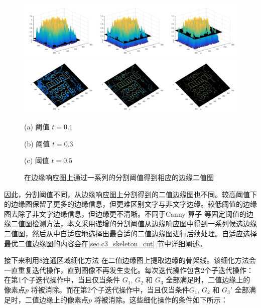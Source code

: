         \begin{figure}[!h]
        \centering
        \includegraphics[width=\textwidth]{./figures/c3_edge_response.jpg}
        \includegraphics[width=\textwidth]{./figures/c3_edge_map.jpg}
        \begin{minipage}[t]{0.32\linewidth}
        \centerline{ \small (a) 阈值 $t = 0.1$}
        \end{minipage}
        \begin{minipage}[t]{0.32\linewidth}
        \centerline{ \small (b) 阈值 $t = 0.3$}
        \end{minipage}
        \begin{minipage}[t]{0.32\linewidth}
        \centerline{ \small (c) 阈值 $t = 0.5$}
        \end{minipage}
        \caption{在边缘响应图上通过一系列的分割阈值得到相应的边缘二值图}
        \label{fig.c3_response_to_map}
        \end{figure}

        因此，分割阈值不同，从边缘响应图上分割得到的二值边缘图也不同。较高阈值下的边缘图保留了更多的边缘信息，但更难区别文字与非文字边缘。较低阈值的边缘图去除了非文字边缘信息，但边缘更不清晰。不同于Canny 算子\cite{Ding2001On} 等固定阈值的边缘二值图检测方法，本文采用递增的分割阈值从边缘响应图中得到一系列候选边缘二值图，然后从中自适应地选择出最合适的二值边缘图进行后续处理。自适应选择最优二值边缘图的内容会在\ref{sec.c3_skeleton_cut} 节中详细阐述。

        接下来利用8连通区域细化方法\cite{Lam2002Thinning} 在二值边缘图上提取边缘的骨架线。该细化方法会一直重复迭代操作，直到图像不再发生变化。每次迭代操作包含2个子迭代操作：在第1个子迭代操作中，当且仅当条件 $G_1$, $G_2$ 和 $G_3$ 全部满足时，二值边缘上的像素点$p$ 将被消除。而在第2个子迭代操作中，当且仅当条件$G_1$, $G_2$ 和 $G_3$$'$ 全部满足时，二值边缘上的像素点$p$ 将被消除。这些细化操作的条件如下所示：


